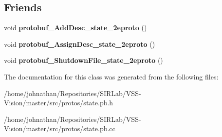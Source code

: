 \subsection*{Friends}
\begin{DoxyCompactItemize}
\item 
void {\bfseries protobuf\+\_\+\+Add\+Desc\+\_\+state\+\_\+2eproto} ()\hypertarget{classvss__state_1_1RGB_aab1a2c258f8122a403a979ff57e2a706}{}\label{classvss__state_1_1RGB_aab1a2c258f8122a403a979ff57e2a706}

\item 
void {\bfseries protobuf\+\_\+\+Assign\+Desc\+\_\+state\+\_\+2eproto} ()\hypertarget{classvss__state_1_1RGB_a57d9367bc8a7a94ead11d11194cca1b6}{}\label{classvss__state_1_1RGB_a57d9367bc8a7a94ead11d11194cca1b6}

\item 
void {\bfseries protobuf\+\_\+\+Shutdown\+File\+\_\+state\+\_\+2eproto} ()\hypertarget{classvss__state_1_1RGB_a4e6dc5e8e72799859c4e9556d090e57d}{}\label{classvss__state_1_1RGB_a4e6dc5e8e72799859c4e9556d090e57d}

\end{DoxyCompactItemize}


The documentation for this class was generated from the following files\+:\begin{DoxyCompactItemize}
\item 
/home/johnathan/\+Repositories/\+S\+I\+R\+Lab/\+V\+S\+S-\/\+Vision/master/src/protos/state.\+pb.\+h\item 
/home/johnathan/\+Repositories/\+S\+I\+R\+Lab/\+V\+S\+S-\/\+Vision/master/src/protos/state.\+pb.\+cc\end{DoxyCompactItemize}
